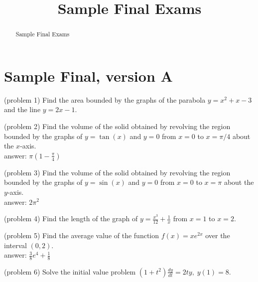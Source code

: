 \documentclass[handout]{ximera}
\title{Sample Final Exams}
\begin{document}
\begin{abstract}
Sample Final Exams
\end{abstract}

\maketitle

\section{Sample Final, version A}


\begin{problem}(problem 1) 
Find the area bounded by the graphs of the parabola $y = x^2 + x - 3$ and the line $y = 2x - 1$.

\end{problem}

\begin{problem}(problem 2)
Find the volume of the solid obtained by revolving the region bounded by the graphs of $y = \tan(x)$ and $y = 0$
from $x = 0$ to $x = \pi/4$ about the $x$-axis.\\
answer: $\displaystyle \pi\left(1-\frac{\pi}{4}\right)$

\end{problem}


\begin{problem}(problem 3)
Find the volume of the solid obtained by revolving the region bounded by the graphs of $y = \sin(x)$ and $y = 0$
from $x = 0$ to $x = \pi$ about the $y$-axis.\\
answer: $\displaystyle 2\pi^2$

\end{problem}


\begin{problem}(problem 4)
Find the length of the graph of
$y = \frac{x^3}{12} + \frac{1}{x}$ from $x = 1$ to $x = 2$.

\end{problem}

\begin{problem}(problem 5)
Find the average value of the function $f(x) = xe^{2x}$ over the interval $(0,2)$.\\
answer: $\displaystyle \frac38 e^4 + \frac18$

\end{problem}


\begin{problem}(problem 6)
Solve the initial value problem $ \displaystyle (1+t^2)\frac{dy}{dt} = 2ty, \; y(1) = 8 $.

\end{problem}
\end{document}
